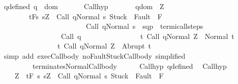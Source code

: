 \begin{isabellebody}
\ q{\isacharunderscore}defined{\isacharcolon}\ {\isachardoublequoteopen}q\ {\isasymin}\ dom\ {\isasymGamma}{\isachardoublequoteclose}\isanewline
\ \ \ \ \isamarkupfalse%
\ Call{\isacharunderscore}hyp\ \isamarkupfalse%
\isanewline
\ \ \ \ \ \ {\isachardoublequoteopen}{\isasymforall}q{\isasymin}dom\ {\isasymGamma}{\isachardot}\ {\isasymforall}Z{\isachardot}\ \isanewline
\ \ \ \ \ \ \ \ {\isasymGamma}{\isacharcomma}{\isasymTheta}{\isasymturnstile}\isactrlsub t\isactrlbsub {\isacharslash}F\isactrlesub {\isacharbraceleft}s{\isachardot}\ s{\isacharequal}Z\ {\isasymand}\ {\isasymGamma}{\isasymturnstile}{\isasymlangle}Call\ q{\isacharcomma}Normal\ s{\isasymrangle}\ {\isasymRightarrow}{\isasymnotin}{\isacharparenleft}{\isacharbraceleft}Stuck{\isacharbraceright}\ {\isasymunion}\ Fault\ {\isacharbackquote}\ {\isacharparenleft}{\isacharminus}F{\isacharparenright}{\isacharparenright}\ {\isasymand}\isanewline
\ \ \ \ \ \ \ \ \ \ \ \ \ \ \ \ \ \ \ \ \ \ \ \ {\isasymGamma}{\isasymturnstile}Call\ q{\isasymdown}Normal\ s\ {\isasymand}\ {\isacharparenleft}{\isacharparenleft}s{\isacharcomma}q{\isacharparenright}{\isacharcomma}{\isacharparenleft}{\isasymsigma}{\isacharcomma}p{\isacharparenright}{\isacharparenright}\ {\isasymin}\ termi{\isacharunderscore}call{\isacharunderscore}steps\ {\isasymGamma}{\isacharbraceright}\isanewline
\ \ \ \ \ \ \ \ \ \ \ \ \ \ \ \ \ {\isacharparenleft}Call\ q{\isacharparenright}\isanewline
\ \ \ \ \ \ \ \ \ \ \ \ \ \ \ \ {\isacharbraceleft}t{\isachardot}\ {\isasymGamma}{\isasymturnstile}{\isasymlangle}Call\ q{\isacharcomma}Normal\ Z{\isasymrangle}\ {\isasymRightarrow}\ Normal\ t{\isacharbraceright}{\isacharcomma}\isanewline
\ \ \ \ \ \ \ \ \ \ \ \ \ \ \ \ {\isacharbraceleft}t{\isachardot}\ {\isasymGamma}{\isasymturnstile}{\isasymlangle}Call\ q{\isacharcomma}Normal\ Z{\isasymrangle}\ {\isasymRightarrow}\ Abrupt\ t{\isacharbraceright}{\isachardoublequoteclose}\isanewline
\ \ \ \ \ \ \isamarkupfalse%
\ {\isacharparenleft}simp\ add{\isacharcolon}\ exec{\isacharunderscore}Call{\isacharunderscore}body{\isacharprime}\ noFaultStuck{\isacharunderscore}Call{\isacharunderscore}body{\isacharprime}\ {\isacharbrackleft}simplified{\isacharbrackright}\isanewline
\ \ \ \ \ \ \ \ \ terminates{\isacharunderscore}Normal{\isacharunderscore}Call{\isacharunderscore}body{\isacharparenright}\isanewline
\ \ \ \ \isamarkupfalse%
\ Call{\isacharunderscore}hyp\ q{\isacharunderscore}defined\ \isamarkupfalse%
\ Call{\isacharunderscore}hyp{\isacharprime}{\isacharcolon}\isanewline
\ \ \ \ {\isachardoublequoteopen}{\isasymforall}Z{\isachardot}\ {\isasymGamma}{\isacharcomma}{\isasymTheta}\ {\isasymturnstile}\isactrlsub t\isactrlbsub {\isacharslash}F\isactrlesub \ {\isacharbraceleft}s{\isachardot}\ s{\isacharequal}Z\ {\isasymand}\ {\isasymGamma}{\isasymturnstile}{\isasymlangle}Call\ q{\isacharcomma}Normal\ s{\isasymrangle}\ {\isasymRightarrow}{\isasymnotin}{\isacharparenleft}{\isacharbraceleft}Stuck{\isacharbraceright}\ {\isasymunion}\ Fault\ {\isacharbackquote}\ {\isacharparenleft}{\isacharminus}F{\isacharparenright}{\isacharparenright}\ {\isasymand}\ \isanewline

\end{isabellebody}
